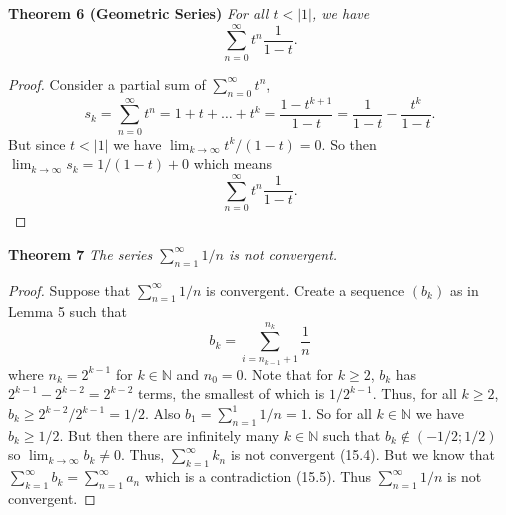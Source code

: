 \documentclass{article}
\begin{document}
\begin{flushleft}
\textbf{Theorem 6 (Geometric Series)}
\textsl{For all $t < |1|$, we have
\[
\sum_{n=0}^{\infty} t^n \frac{1}{1-t}.
\]}
\begin{proof}
Consider a partial sum of $\sum_{n=0}^{\infty} t^n$,
\[
s_k = \sum_{n=0}^{\infty} t^n= 1+t+\dots+t^k = \frac{1-t^{k+1}}{1-t} = \frac{1}{1-t} - \frac{t^k}{1-t}.
\]
But since $t < |1|$ we have $\lim_{k \rightarrow \infty} t^k/(1-t) = 0$. So then $\lim_{k \rightarrow \infty} s_k = 1/(1-t) + 0$ which means
\[
\sum_{n=0}^{\infty} t^n \frac{1}{1-t}.
\]
\end{proof}

\textbf{Theorem 7}
\textsl{The series $\sum_{n=1}^{\infty} 1/n$ is not convergent.}
\begin{proof}
Suppose that $\sum_{n=1}^{\infty} 1/n$ is convergent. Create a sequence $(b_k)$ as in Lemma 5 such that
\[
b_k = \sum_{i = n_{k-1} + 1}^{n_k} \frac{1}{n}
\]
where $n_k = 2^{k-1}$ for $k \in \mathbb{N}$ and $n_0 = 0$. Note that for $k \geq 2$, $b_k$ has $2^{k-1} - 2^{k-2} = 2^{k-2}$ terms, the smallest of which is $1/2^{k-1}$. Thus, for all $k \geq 2$, $b_k \geq 2^{k-2}/2^{k-1} = 1/2$. Also $b_1 = \sum_{n=1}^{1} 1/n = 1$. So for all $k \in \mathbb{N}$ we have $b_k \geq 1/2$. But then there are infinitely many $k \in \mathbb{N}$ such that $b_k \notin (-1/2 ; 1/2)$ so $\lim_{k \rightarrow \infty} b_k \neq 0$. Thus, $\sum_{k=1}^{\infty} k_n$ is not convergent (15.4). But we know that $\sum_{k=1}^{\infty} b_k = \sum_{n=1}^{\infty} a_n$ which is a contradiction (15.5). Thus $\sum_{n=1}^{\infty} 1/n$ is not convergent.
\end{proof}


\end{flushleft}
\end{document}
